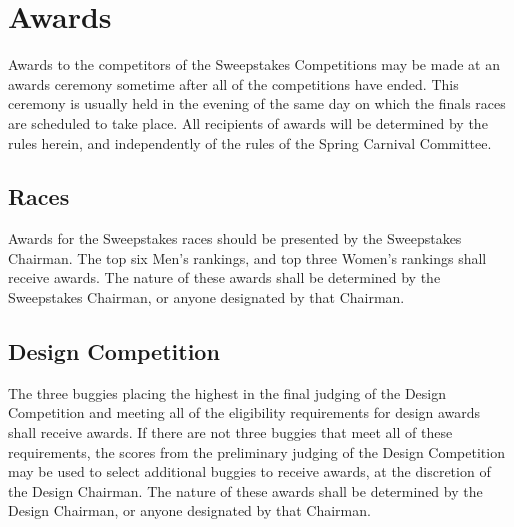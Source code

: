 \chapter{Awards}

	Awards to the competitors of the Sweepstakes Competitions may be made at an
	awards ceremony sometime after all of the competitions have ended. This 
	ceremony is usually held in the evening of the same day on which the finals
	races are scheduled to take place. All recipients of awards will be 
	determined by the rules herein, and independently of the rules of the Spring
	Carnival Committee.

\section{Races}

	Awards for the Sweepstakes races should be presented by the Sweepstakes
	Chairman. The top six Men's rankings, and top three Women's rankings shall 
	receive awards. The nature of these awards shall be determined by the 
	Sweepstakes Chairman, or anyone designated by that Chairman.

\section{Design Competition}

	The three buggies placing the highest in the final judging of the Design 
	Competition and meeting all of the eligibility requirements for design 
	awards shall receive awards. If there are not three buggies that meet all 
	of these requirements, the scores from the preliminary judging of the Design
	Competition may be used to select additional buggies to receive awards, at 
	the discretion of the Design Chairman. The nature of these awards shall be 
	determined by the Design Chairman, or anyone designated by that Chairman.

